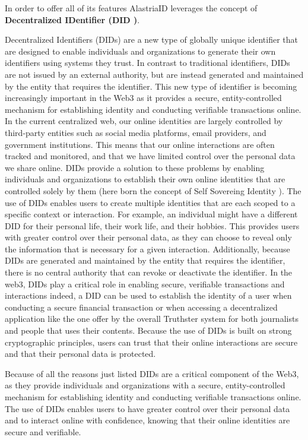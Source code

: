 \documentclass[target=mst,aauheader=]{thud}
\begin{document}
In order to offer all of its features AlastriaID leverages the concept of \textbf{Decentralized IDentifier (DID \cite{DID})}.

Decentralized Identifiers (DIDs) are a new type of globally unique identifier that are designed to enable individuals and organizations to generate their own identifiers using systems they trust. In contrast to traditional identifiers, DIDs are not issued by an external authority, but are instead generated and maintained by the entity that requires the identifier. This new type of identifier is becoming increasingly important in the Web3 as it provides a secure, entity-controlled mechanism for establishing identity and conducting verifiable transactions online.
In the current centralized web, our online identities are largely controlled by third-party entities such as social media platforms, email providers, and government institutions. This means that our online interactions are often tracked and monitored, and that we have limited control over the personal data we share online. DIDs provide a solution to these problems by enabling individuals and organizations to establish their own online identities that are controlled solely by them (here born the concept of Self Sovereing Identity \cite{selfSovereignIdentity}).
The use of DIDs enables users to create multiple identities that are each scoped to a specific context or interaction. For example, an individual might have a different DID for their personal life, their work life, and their hobbies. This provides users with greater control over their personal data, as they can choose to reveal only the information that is necessary for a given interaction. Additionally, because DIDs are generated and maintained by the entity that requires the identifier, there is no central authority that can revoke or deactivate the identifier.
In the web3, DIDs play a critical role in enabling secure, verifiable transactions and interactions indeed, a DID can be used to establish the identity of a user when conducting a secure financial transaction or when accessing a decentralized application like the one offer by the overall Truthster system for both journalists and people that uses their contents. Because the use of DIDs is built on strong cryptographic principles, users can trust that their online interactions are secure and that their personal data is protected.

Because of all the reasons just listed DIDs are a critical component of the Web3, as they provide individuals and organizations with a secure, entity-controlled mechanism for establishing identity and conducting verifiable transactions online. The use of DIDs enables users to have greater control over their personal data and to interact online with confidence, knowing that their online identities are secure and verifiable.
\end{document}
